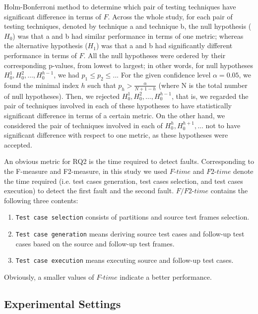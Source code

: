 \documentclass[10pt,journal,compsoc]{IEEEtran}
\begin{document}
Holm-Bonferroni method \cite{holm1979simple} to determine which pair of testing techniques have significant difference in terms of $F$. Across the whole study, for each pair of testing techniques, denoted by technique a and technique b, the null hypothesis ($H_0$) was that a and b had similar performance in terms of one metric; whereas the alternative hypothesis ($H_1$) was that a and b had significantly different performance in terms of $F$. All the null hypotheses were ordered by their corresponding p-values, from lowest to largest; in other words, for null hypotheses $H_0^1, H_0^2, \ldots, H_0^{h-1}$, we had $p_1 \leq p_2 \leq ...$ For the given confidence level $\alpha = 0.05$, we found the minimal index $h$ such that $p_h > \frac{\alpha}{N + 1 - h}$ (where N is the total number of null hypotheses). Then, we rejected $H_0^1, H_0^2, \ldots, H_0^{h-1}$, that is, we regarded the pair of techniques involved in each of these hypotheses to have statistically significant difference in terms of a certain metric.
On the other hand, we considered the pair of techniques involved in each of $H_0^h, H_0^{h + 1}, ...$ not to have significant difference with respect to one metric, as these hypotheses were accepted.


An obvious metric for RQ2 is the time required to detect faults. Corresponding to the F-measure and F2-measure, in this study we used $F$-$time$ and $F2$-$time$ denote the time required (i.e. test cases generation, test cases selection, and test cases execution) to detect the first fault and the second fault.
$F/F2$-$time$ contains the following three contents:
\begin{enumerate}[1]
  \item
  \texttt{Test case selection} consists of partitions and source test frames selection.
  \item
  \texttt{Test case generation} means deriving source test cases and follow-up test cases based on  the source and follow-up test frames.
  \item
  \texttt{Test case execution} means executing source and follow-up test cases. 

\end{enumerate}

Obviously, a smaller values of $F$-$time$ indicate a better performance.



\subsection{Experimental Settings}
\label{sec:setting}
\end{document}
